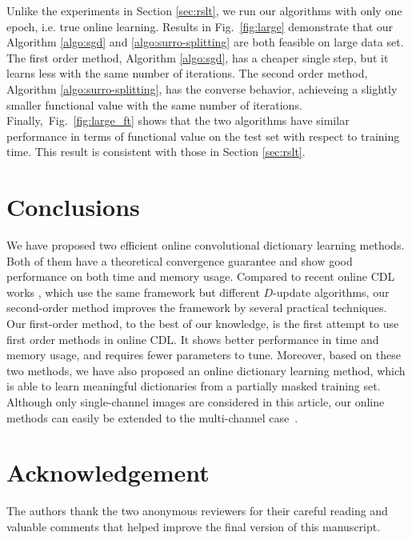 \documentclass[final]{siamart1116}
\newcommand{\ie}{i.e.\xspace}
\newcommand{\fig}[1]{Fig.~\ref{fig:#1}}
\begin{document}
Unlike the experiments in Section \ref{sec:rslt}, we run our algorithms with only one epoch, \ie true online learning. Results in \fig{large} demonstrate that our Algorithm \ref{algo:sgd} and \ref{algo:surro-splitting} are both feasible on large data set. The first order method, Algorithm \ref{algo:sgd}, has a cheaper single step, but it learns less with the same number of iterations. The second order method, Algorithm \ref{algo:surro-splitting}, has the converse behavior, achieveing a slightly smaller functional value with the same number of iterations. Finally,~\fig{large_ft} shows that the two algorithms have similar performance in terms of functional value on the test set with respect to training time. This result is consistent with those in Section \ref{sec:rslt}.


\section{Conclusions}
\label{sec:concl}

We have proposed two efficient online convolutional dictionary learning methods. Both of them have a theoretical convergence guarantee and show good performance on both time and memory usage. Compared to recent online CDL works \cite{degraux-2017-online, wang2017online}, which use the same framework but different $D$-update algorithms, our second-order method improves the framework by several practical techniques. Our first-order method, to the best of our knowledge, is the first attempt to use first order methods in online CDL.  It shows better performance in time and memory usage, and requires fewer parameters to tune.  Moreover, based on these two methods, we have also proposed an online dictionary learning method, which is able to learn meaningful dictionaries from a partially masked training set. Although only single-channel images are considered in this article, our online methods can easily be extended to the multi-channel case~\cite{wohlberg-2016-convolutional}.



\section*{Acknowledgement} The authors thank the two anonymous reviewers for their careful reading and valuable comments that helped improve the final version of this manuscript.



\appendix
\end{document}
